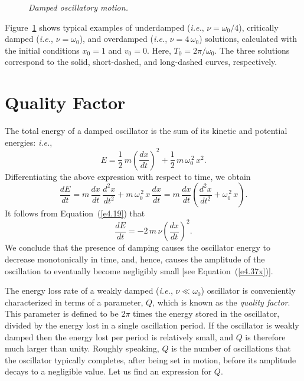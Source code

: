 \begin{figure}
\epsfysize=2.5in
\centerline{}
\caption{\em Damped oscillatory motion.}\label{fosc}   
\end{figure}

Figure~\ref{fosc} shows typical examples of underdamped ({\em i.e.}, $\nu=\omega_0/4$), critically damped ({\em i.e.}, $\nu=\omega_0$), and
overdamped ({\em i.e.}, $\nu=4\,\omega_0$) solutions, calculated with the
initial conditions $x_0=1$ and $v_0=0$. Here, $T_0= 2\pi/\omega_0$. 
The three solutions correspond to the solid, short-dashed, and long-dashed curves,
respectively.

\section{Quality Factor}\label{squal}
The total energy of a damped oscillator is the sum of its kinetic and
potential energies: {\em i.e.}, 
\begin{equation}
E = \frac{1}{2}\,m\left(\frac{dx}{dt}\right)^2 + \frac{1}{2}\,m\,\omega_0^{\,2}\,x^2.
\end{equation}
Differentiating the above expression with
respect to time, we obtain
\begin{equation}
\frac{dE}{dt} = m\,\frac{dx}{dt}\,\frac{d^2 x}{dt^2} + m\,\omega_0^{\,2}\,x\,\frac{dx}{dt} = m\,\frac{dx}{dt}\left(\frac{d^2 x}{dt^2} + \omega_0^{\,2}\,x\right).
\end{equation}
It follows from Equation~(\ref{e4.19}) that
\begin{equation}\label{e4.52x}
\frac{dE}{dt} = -2\,m\,\nu\left(\frac{dx}{dt}\right)^2.
\end{equation}
We conclude that the presence of damping causes the oscillator energy to
decrease monotonically in time, and, hence, causes the   amplitude of the oscillation to eventually become negligibly small [see Equation~(\ref{e4.37x})].

The energy loss rate of a weakly damped ({\em i.e.}, $\nu\ll\omega_0$) oscillator is conveniently 
characterized in terms of a parameter, $Q$, which is known as the 
{\em quality factor}. This parameter is defined to be $2\pi$ times the
energy stored in the oscillator, divided by the energy lost in a single
 oscillation period. If the oscillator is weakly damped then
the energy lost per period is relatively small, and $Q$ is therefore
much larger than unity.  Roughly speaking, $Q$ is the number of oscillations
 that the oscillator typically completes, after being set in motion, before its
 amplitude decays to a negligible value.
 Let us find an expression for $Q$.

